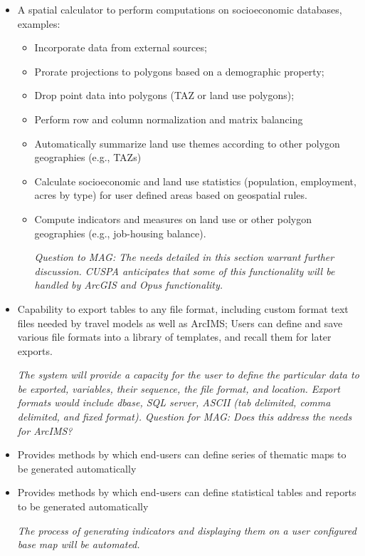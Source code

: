 \documentclass[titlepage]{article}
\begin{document}
\begin{itemize}
\item A spatial calculator to perform computations on socioeconomic databases, examples:
\begin{itemize}
\item Incorporate data from external sources;
\item Prorate projections to polygons based on a demographic property;
\item Drop point data into polygons (TAZ or land use polygons);
\item Perform row and column normalization and matrix balancing
\item Automatically summarize land use themes according to other polygon geographies (e.g., TAZs)
\item Calculate socioeconomic and land use statistics (population, employment, acres by type) for user defined areas based on geospatial rules.
\item Compute indicators and measures on land use or other polygon geographies (e.g., job-housing balance).

\emph{Question to MAG: The needs detailed in this section warrant further discussion.  CUSPA anticipates that some of this functionality will be handled by ArcGIS and Opus functionality.}

\end{itemize}

\item Capability to export tables to any file format, including custom format text files needed by travel models as well as ArcIMS; Users can define and save various file formats into a library of templates, and recall them for later exports.

\emph{The system will provide a capacity for the user to define the particular data to be exported, variables, their sequence, the file format, and location.  Export formats would include dbase, SQL server, ASCII (tab delimited, comma delimited, and fixed format). Question for MAG: Does this address the needs for ArcIMS?}

\item Provides methods by which end-users can define series of thematic maps to be generated automatically
\item Provides methods by which end-users can define statistical tables and reports to be generated automatically

\emph{The process of generating indicators and displaying them on a user configured base map will be automated.}

\end{itemize}
\end{document}
